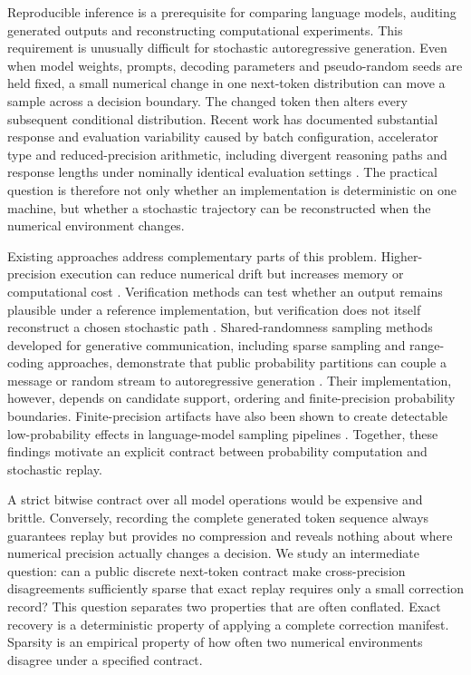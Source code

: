 \documentclass{nature}
\begin{document}
Reproducible inference is a prerequisite for comparing language models, auditing generated outputs and reconstructing computational experiments. This requirement is unusually difficult for stochastic autoregressive generation. Even when model weights, prompts, decoding parameters and pseudo-random seeds are held fixed, a small numerical change in one next-token distribution can move a sample across a decision boundary. The changed token then alters every subsequent conditional distribution. Recent work has documented substantial response and evaluation variability caused by batch configuration, accelerator type and reduced-precision arithmetic, including divergent reasoning paths and response lengths under nominally identical evaluation settings \cite{ref1}. The practical question is therefore not only whether an implementation is deterministic on one machine, but whether a stochastic trajectory can be reconstructed when the numerical environment changes.

Existing approaches address complementary parts of this problem. Higher-precision execution can reduce numerical drift but increases memory or computational cost \cite{ref1}. Verification methods can test whether an output remains plausible under a reference implementation, but verification does not itself reconstruct a chosen stochastic path \cite{ref2}. Shared-randomness sampling methods developed for generative communication, including sparse sampling and range-coding approaches, demonstrate that public probability partitions can couple a message or random stream to autoregressive generation \cite{ref3,ref4}. Their implementation, however, depends on candidate support, ordering and finite-precision probability boundaries. Finite-precision artifacts have also been shown to create detectable low-probability effects in language-model sampling pipelines \cite{ref5}. Together, these findings motivate an explicit contract between probability computation and stochastic replay.

A strict bitwise contract over all model operations would be expensive and brittle. Conversely, recording the complete generated token sequence always guarantees replay but provides no compression and reveals nothing about where numerical precision actually changes a decision. We study an intermediate question: can a public discrete next-token contract make cross-precision disagreements sufficiently sparse that exact replay requires only a small correction record? This question separates two properties that are often conflated. Exact recovery is a deterministic property of applying a complete correction manifest. Sparsity is an empirical property of how often two numerical environments disagree under a specified contract.
\end{document}
